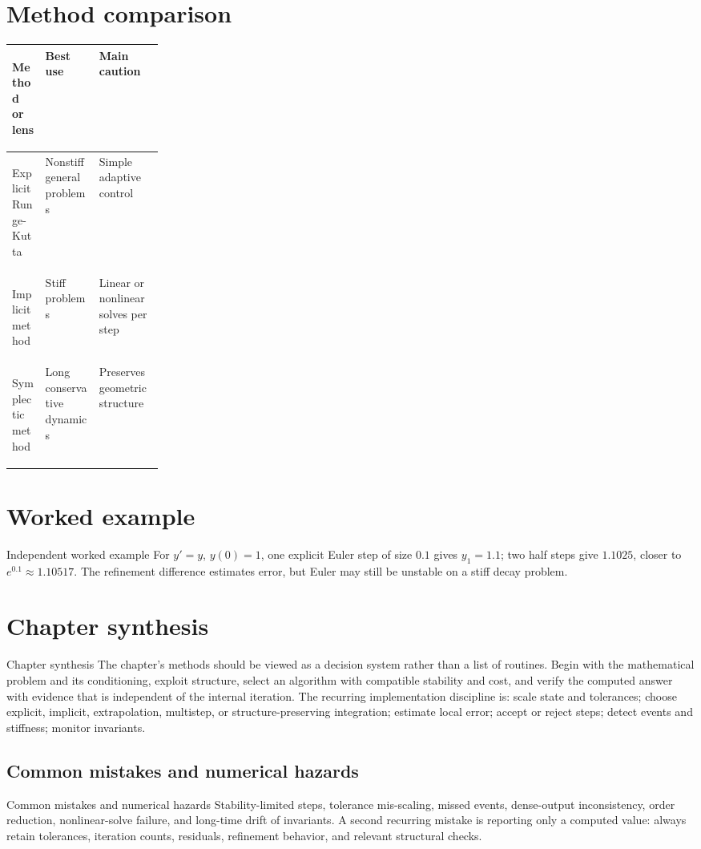 \documentclass[10pt,letterpaper]{article}
\begin{document}
\section*{Method comparison}
\begin{center}
\small
\begin{tabularx}{\linewidth}{>{\bfseries\raggedright\arraybackslash}p{0.22\linewidth}XX}
\toprule
Method or lens & Best use & Main caution \\
\midrule
Explicit Runge-Kutta & Nonstiff general problems & Simple adaptive control \\
Implicit method & Stiff problems & Linear or nonlinear solves per step \\
Symplectic method & Long conservative dynamics & Preserves geometric structure \\
\bottomrule
\end{tabularx}
\end{center}

\section*{Worked example}
\begin{exambox}{Independent worked example}
For $y'=y$, $y(0)=1$, one explicit Euler step of size $0.1$ gives $y_1=1.1$; two half steps give $1.1025$, closer to $e^{0.1}\approx1.10517$.  The refinement difference estimates error, but Euler may still be unstable on a stiff decay problem.
\end{exambox}

\section*{Chapter synthesis}
\begin{summarybox}{Chapter synthesis}
The chapter's methods should be viewed as a decision system rather than a list of routines.  Begin with the mathematical problem and its conditioning, exploit structure, select an algorithm with compatible stability and cost, and verify the computed answer with evidence that is independent of the internal iteration.  The recurring implementation discipline is: scale state and tolerances; choose explicit, implicit, extrapolation, multistep, or structure-preserving integration; estimate local error; accept or reject steps; detect events and stiffness; monitor invariants.
\end{summarybox}

\subsection*{Common mistakes and numerical hazards}
\begin{warnbox}{Common mistakes and numerical hazards}
Stability-limited steps, tolerance mis-scaling, missed events, dense-output inconsistency, order reduction, nonlinear-solve failure, and long-time drift of invariants.  A second recurring mistake is reporting only a computed value: always retain tolerances, iteration counts, residuals, refinement behavior, and relevant structural checks.
\end{warnbox}
\end{document}
